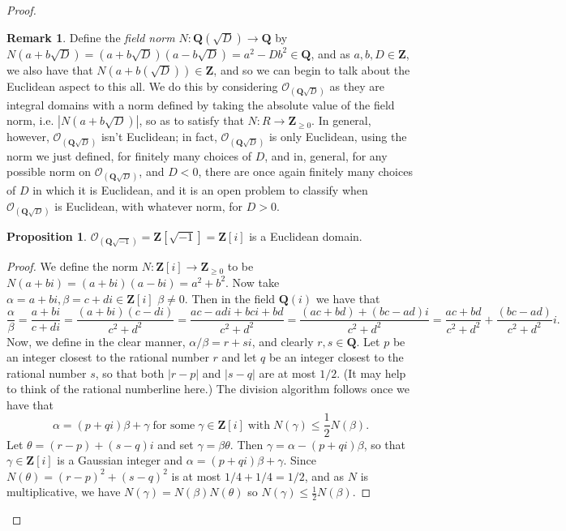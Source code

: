 \documentclass[9pt,reqno]{amsart}
\theoremstyle{definition}
\newtheorem{rem}{Remark}[section]
\newtheorem{prop}{Proposition}[section]
\newcommand{\zz}{\mathbf Z}
\newcommand{\qq}{\mathbf Q}
\begin{document}
\begin{proof}
\begin{rem}
Define the \textit{field norm} $N \colon \qq (\sqrt{D})  \to \qq$ by $N (a+b \sqrt{D}) = (a+b\sqrt{D})(a-b\sqrt{D}) = a^2 - Db^2 \in \qq$, and as $a, b, D \in \zz$, we also have that $N(a+b (\sqrt{D})) \in \zz$, and so we can begin to talk about the Euclidean aspect to this all. We do this by considering $\mathcal{O}_{(\qq \sqrt{D})}$ as they are integral domains with a norm defined by taking the absolute value of the field norm, i.e. $|N(a+b\sqrt{D})|$, so as to satisfy that $N  \colon R \to \zz_{\geq 0 }$. In general, however, $\mathcal{O}_{(\qq \sqrt{D})}$ isn't Euclidean; in fact, $\mathcal{O}_{(\qq \sqrt{D})}$ is only Euclidean, using the norm we just defined, for finitely many choices of $D$, and in, general, for any possible norm on $\mathcal{O}_{(\qq \sqrt{D})}$, and $D<0$, there are once again finitely many choices of $D$ in which it is Euclidean, and it is an open problem to classify when $\mathcal{O}_{(\qq \sqrt{D})}$ is Euclidean, with whatever norm, for $D>0$. 
\end{rem}
\begin{prop}
$\mathcal{O}_{(\qq \sqrt{-1})} 	 = \zz[\sqrt{-1} ] = \zz[i]$ is a Euclidean domain.
\end{prop}
\begin{proof}
	We define the norm $N \colon \zz[i] \to \zz_{\geq 0}$ to be $N (a+bi)= (a+bi)(a-bi) = a^2 +b^2$. Now take $\alpha = a+bi, \beta = c+di \in \zz[i]$ $\beta \neq 0$. Then in the field $\qq (i)$ we have that $$\frac{\alpha}{\beta} = \frac{a+bi}{c+di} = \frac{(a+bi)(c-di)}{c^2+d^2} = \frac{ac-adi+bci+bd}{c^2+d^2} = \frac{(ac+bd) +(bc-ad)i}{c^2+d^2} = \frac{ac+bd}{c^2+d^2} + \frac{(bc-ad)}{c^2+d^2}i.$$ Now, we define in the clear manner, $\alpha/ \beta = r+si$, and clearly $r, s \in \qq$. Let $p$ be an integer closest to the rational number $r$ and let $q$ be an integer closest to the rational number $s$, so that both $|r-p|$ and $|s-q|$ are at most $1/2$. (It may help to think of the rational numberline here.) The division algorithm follows once we have that $$ \alpha = (p+qi) \beta + \gamma \; \text{for some} \; \gamma \in \zz[i] \; \text{with} \; N(\gamma) \leq \frac{1}{2} N(\beta).$$ Let $\theta = (r-p) + (s-q)i$ and set $\gamma = \beta \theta$. Then $\gamma = \alpha - (p+qi) \beta$, so that $\gamma \in \zz[i]$ is a Gaussian integer and $\alpha = (p+qi) \beta + \gamma$. Since $N( \theta) = (r-p)^2 + (s-q)^2$ is at most $1/4 + 1/4 = 1/2$, and as $N$ is multiplicative, we have $N ( \gamma) = N(\beta) N(\theta)$ so $N(\gamma) \leq \frac{1}{2} N(\beta)$. 
	\end{proof}

\end{proof}
\end{document}
